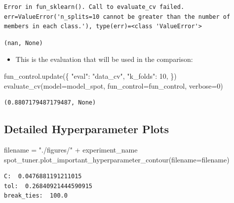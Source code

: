 \documentclass[
  letterpaper,
  DIV=11,
  numbers=noendperiod]{scrreprt}
\newenvironment{Shaded}{\begin{snugshade}}{\end{snugshade}}
\newcommand{\DecValTok}[1]{\textcolor[rgb]{0.68,0.00,0.00}{#1}}
\newcommand{\NormalTok}[1]{\textcolor[rgb]{0.00,0.23,0.31}{#1}}
\newcommand{\OperatorTok}[1]{\textcolor[rgb]{0.37,0.37,0.37}{#1}}
\newcommand{\StringTok}[1]{\textcolor[rgb]{0.13,0.47,0.30}{#1}}
\providecommand{\tightlist}{%
  \setlength{\itemsep}{0pt}\setlength{\parskip}{0pt}}\usepackage{longtable,booktabs,array}
\begin{document}
\begin{verbatim}
Error in fun_sklearn(). Call to evaluate_cv failed. err=ValueError('n_splits=10 cannot be greater than the number of members in each class.'), type(err)=<class 'ValueError'>
\end{verbatim}

\begin{verbatim}
(nan, None)
\end{verbatim}

\begin{itemize}
\tightlist
\item
  This is the evaluation that will be used in the comparison:
\end{itemize}

\begin{Shaded}
\begin{Highlighting}[]
\NormalTok{fun\_control.update(\{}
     \StringTok{"eval"}\NormalTok{: }\StringTok{"data\_cv"}\NormalTok{,}
     \StringTok{"k\_folds"}\NormalTok{: }\DecValTok{10}\NormalTok{,}
\NormalTok{\})}
\NormalTok{evaluate\_cv(model}\OperatorTok{=}\NormalTok{model\_spot, fun\_control}\OperatorTok{=}\NormalTok{fun\_control, verbose}\OperatorTok{=}\DecValTok{0}\NormalTok{)}
\end{Highlighting}
\end{Shaded}

\begin{verbatim}
(0.8807179487179487, None)
\end{verbatim}

\hypertarget{detailed-hyperparameter-plots-3}{%
\subsection{Detailed Hyperparameter
Plots}\label{detailed-hyperparameter-plots-3}}

\begin{Shaded}
\begin{Highlighting}[]
\NormalTok{filename }\OperatorTok{=} \StringTok{"./figures/"} \OperatorTok{+}\NormalTok{ experiment\_name}
\NormalTok{spot\_tuner.plot\_important\_hyperparameter\_contour(filename}\OperatorTok{=}\NormalTok{filename)}
\end{Highlighting}
\end{Shaded}

\begin{verbatim}
C:  0.0476881191211015
tol:  0.26840921444590915
break_ties:  100.0
\end{verbatim}
\end{document}

